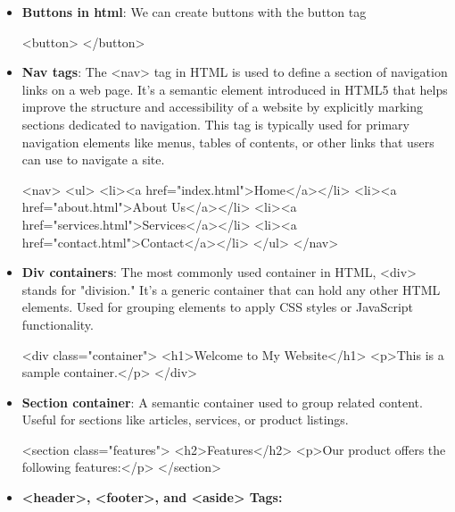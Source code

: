 \documentclass{report}
\begin{document}
\begin{itemize}
    \item \textbf{Buttons in html}: We can create buttons with the button tag
        \bigbreak \noindent 
        \begin{htmlcode}
            <button> </button>
        \end{htmlcode}
    \item \textbf{Nav tags}: The <nav> tag in HTML is used to define a section of navigation links on a web page. It's a semantic element introduced in HTML5 that helps improve the structure and accessibility of a website by explicitly marking sections dedicated to navigation. This tag is typically used for primary navigation elements like menus, tables of contents, or other links that users can use to navigate a site.
        \bigbreak \noindent 
        \begin{htmlcode}
            <nav>
                <ul>
                    <li><a href="index.html">Home</a></li>
                    <li><a href="about.html">About Us</a></li>
                    <li><a href="services.html">Services</a></li>
                    <li><a href="contact.html">Contact</a></li>
                </ul>
            </nav>
        \end{htmlcode}
    \item \textbf{Div containers}: The most commonly used container in HTML, <div> stands for "division."
        \bigbreak \noindent 
        It's a generic container that can hold any other HTML elements.
        \bigbreak \noindent 
        Used for grouping elements to apply CSS styles or JavaScript functionality.
        \bigbreak \noindent 
        \begin{htmlcode}
            <div class="container">
                <h1>Welcome to My Website</h1>
                <p>This is a sample container.</p>
            </div>
        \end{htmlcode}
    \item \textbf{Section container}: A semantic container used to group related content.
        \bigbreak \noindent 
        Useful for sections like articles, services, or product listings.
        \bigbreak \noindent 
        \begin{htmlcode}
            <section class="features">
                <h2>Features</h2>
                <p>Our product offers the following features:</p>
            </section>
        \end{htmlcode}
    \item \textbf{<header>, <footer>, and <aside> Tags:}
        \begin{itemize}

\end{itemize}
\end{itemize}
\end{document}
